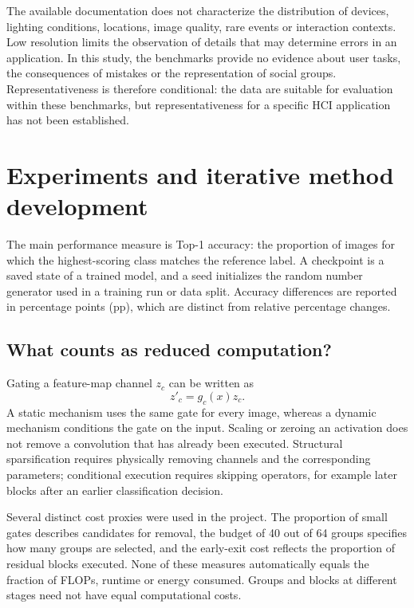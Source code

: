 \documentclass[12pt,a4paper]{article}
\newcommand{\pp}{pp}
\begin{document}
The available documentation does not characterize the distribution of
devices, lighting conditions, locations, image quality, rare events or
interaction contexts. Low resolution limits the observation of details
that may determine errors in an application.
In this study, the benchmarks provide no evidence about user tasks,
the consequences of mistakes or the representation of social groups.
Representativeness is therefore conditional: the data are suitable for
evaluation within these benchmarks, but representativeness for a specific
HCI application has not been established.

\section{Experiments and iterative method development}

The main performance measure is Top-1 accuracy: the proportion of images
for which the highest-scoring class matches the reference label.
A checkpoint is a saved state of a trained model, and a seed initializes
the random number generator used in a training run or data split.
Accuracy differences are reported in percentage points (\pp),
which are distinct from relative percentage changes.

\subsection{What counts as reduced computation?}

Gating a feature-map channel $z_c$ can be written as
\begin{equation}
z'_c=g_c(x)z_c.
\end{equation}
A static mechanism uses the same gate for every image, whereas a dynamic
mechanism conditions the gate on the input. Scaling or zeroing an activation
does not remove a convolution that has already been executed.
Structural sparsification requires physically removing channels and the
corresponding parameters; conditional execution requires skipping operators,
for example later blocks after an earlier classification decision.

Several distinct cost proxies were used in the project.
The proportion of small gates describes candidates for removal,
the budget of 40 out of 64 groups specifies how many groups are selected,
and the early-exit cost reflects the proportion of residual blocks executed.
None of these measures automatically equals the fraction of FLOPs,
runtime or energy consumed. Groups and blocks at different stages
need not have equal computational costs.
\end{document}
